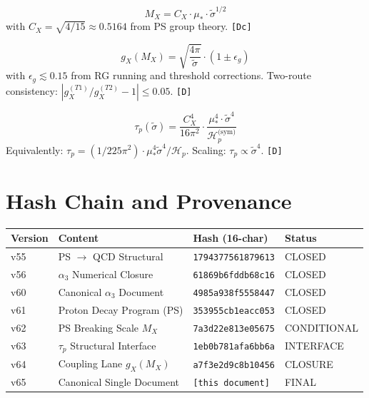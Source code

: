 \documentclass[11pt,a4paper]{article}
\newcommand{\tagD}{\textcolor{green!50!black}{\texttt{[D]}}}
\newcommand{\tagDc}{\textcolor{blue!70!black}{\texttt{[Dc]}}}
\theoremstyle{definition}
\begin{document}
\begin{boxthree}
\begin{equation}
\label{eq:box3-mx}
\boxed{M_X = C_X \cdot \mu_* \cdot \tilde{\sigma}^{1/2}}
\end{equation}
with $C_X = \sqrt{4/15} \approx 0.5164$ from PS group theory. \tagDc{}
\end{boxthree}

\begin{boxfour}
\begin{equation}
\label{eq:box4-gx}
\boxed{g_X(M_X) = \sqrt{\frac{4\pi}{\tilde{\sigma}}} \cdot (1 \pm \epsilon_g)}
\end{equation}
with $\epsilon_g \lesssim 0.15$ from RG running and threshold corrections.
Two-route consistency: $|g_X^{(T1)}/g_X^{(T2)} - 1| \leq 0.05$. \tagD{}
\end{boxfour}

\begin{boxfive}
\begin{equation}
\label{eq:box5-taup}
\boxed{\tau_p(\tilde{\sigma}) = \frac{C_X^4}{16\pi^2} \cdot \frac{\mu_*^4 \cdot \tilde{\sigma}^4}{\mathcal{H}_p^{\text{(sym)}}}}
\end{equation}
Equivalently: $\tau_p = (1/225\pi^2) \cdot \mu_*^4 \tilde{\sigma}^4 / \mathcal{H}_p$.
Scaling: $\tau_p \propto \tilde{\sigma}^4$. \tagD{}
\end{boxfive}

\section{Hash Chain and Provenance}
\label{sec:hashchain}

\begin{center}
\begin{tabular}{llll}
\toprule
Version & Content & Hash (16-char) & Status \\
\midrule
v55 & PS $\to$ QCD Structural & \texttt{1794377561879613} & CLOSED \\
v56 & $\alpha_3$ Numerical Closure & \texttt{61869b6fddb68c16} & CLOSED \\
v60 & Canonical $\alpha_3$ Document & \texttt{4985a938f5558447} & CLOSED \\
v61 & Proton Decay Program (PS) & \texttt{353955cb1eacc053} & CLOSED \\
v62 & PS Breaking Scale $M_X$ & \texttt{7a3d22e813e05675} & CONDITIONAL \\
v63 & $\tau_p$ Structural Interface & \texttt{1eb0b781afa6bb6a} & INTERFACE \\
v64 & Coupling Lane $g_X(M_X)$ & \texttt{a7f3e2d9c8b10456} & CLOSURE \\
v65 & Canonical Single Document & \texttt{[this document]} & FINAL \\
\bottomrule
\end{tabular}
\end{center}
\end{document}

